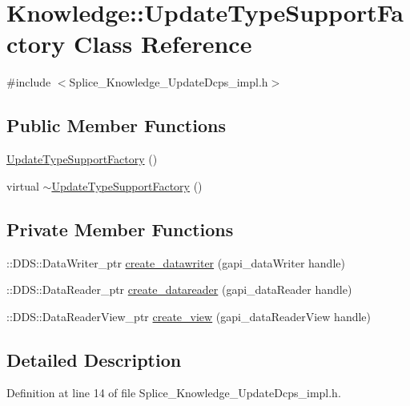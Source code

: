 \hypertarget{classKnowledge_1_1UpdateTypeSupportFactory}{
\section{Knowledge::UpdateTypeSupportFactory Class Reference}
\label{dc/dd4/classKnowledge_1_1UpdateTypeSupportFactory}
}


{\ttfamily \#include $<$Splice\_\-Knowledge\_\-UpdateDcps\_\-impl.h$>$}

\subsection*{Public Member Functions}
\begin{DoxyCompactItemize}
\item 
\hyperlink{classKnowledge_1_1UpdateTypeSupportFactory_a30c9321b55370294e0b271cdb73ed53a}{UpdateTypeSupportFactory} ()
\item 
virtual \hyperlink{classKnowledge_1_1UpdateTypeSupportFactory_aafb582ca6f76076acf37586848d9d2ef}{$\sim$UpdateTypeSupportFactory} ()
\end{DoxyCompactItemize}
\subsection*{Private Member Functions}
\begin{DoxyCompactItemize}
\item 
::DDS::DataWriter\_\-ptr \hyperlink{classKnowledge_1_1UpdateTypeSupportFactory_a80449b3676490c53ba0859b35541ba74}{create\_\-datawriter} (gapi\_\-dataWriter handle)
\item 
::DDS::DataReader\_\-ptr \hyperlink{classKnowledge_1_1UpdateTypeSupportFactory_a0c5c4149fff5155f20a63a70c61141e1}{create\_\-datareader} (gapi\_\-dataReader handle)
\item 
::DDS::DataReaderView\_\-ptr \hyperlink{classKnowledge_1_1UpdateTypeSupportFactory_ad105603582db190af7a1d0840f0c9b46}{create\_\-view} (gapi\_\-dataReaderView handle)
\end{DoxyCompactItemize}


\subsection{Detailed Description}


Definition at line 14 of file Splice\_\-Knowledge\_\-UpdateDcps\_\-impl.h.



